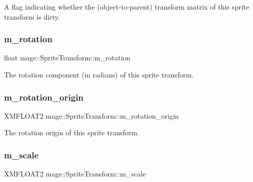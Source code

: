 A flag indicating whether the (object-\/to-\/parent) transform matrix of this sprite transform is dirty. \hypertarget{structmage_1_1_sprite_transform_a6fcb43d224953ea5f38ef54c4e10e003}{}\label{structmage_1_1_sprite_transform_a6fcb43d224953ea5f38ef54c4e10e003} 
\subsubsection{\texorpdfstring{m\+\_\+rotation}{m\_rotation}}
{\footnotesize\ttfamily float mage\+::\+Sprite\+Transform\+::m\+\_\+rotation\hspace{0.3cm}{\ttfamily [private]}}

The rotation component (in radians) of this sprite transform. \hypertarget{structmage_1_1_sprite_transform_ae51ebd0226ef4b569b6a66884823bd18}{}\label{structmage_1_1_sprite_transform_ae51ebd0226ef4b569b6a66884823bd18} 
\subsubsection{\texorpdfstring{m\+\_\+rotation\+\_\+origin}{m\_rotation\_origin}}
{\footnotesize\ttfamily X\+M\+F\+L\+O\+A\+T2 mage\+::\+Sprite\+Transform\+::m\+\_\+rotation\+\_\+origin\hspace{0.3cm}{\ttfamily [private]}}

The rotation origin of this sprite transform. \hypertarget{structmage_1_1_sprite_transform_a7532d4d41d02b5fa6f31eeb4fd4fd886}{}\label{structmage_1_1_sprite_transform_a7532d4d41d02b5fa6f31eeb4fd4fd886} 
\subsubsection{\texorpdfstring{m\+\_\+scale}{m\_scale}}
{\footnotesize\ttfamily X\+M\+F\+L\+O\+A\+T2 mage\+::\+Sprite\+Transform\+::m\+\_\+scale\hspace{0.3cm}{\ttfamily [private]}}

